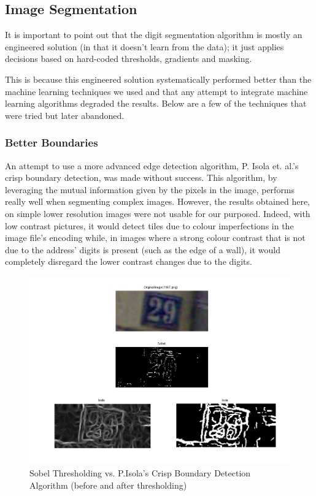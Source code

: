 \documentclass{article} %
\begin{document}
\subsection{Image Segmentation}

It is important to point out that the digit segmentation algorithm is mostly an engineered solution (in that it doesn’t learn from the data); it just applies decisions based on hard-coded thresholds, gradients and masking.

This is because this engineered solution systematically performed better than the machine learning techniques we used and that any attempt to integrate machine learning algorithms degraded the results. Below are a few of the techniques that were tried but later abandoned.

\subsubsection{Better Boundaries}
An attempt to use a more advanced edge detection algorithm, P. Isola et. al.’s crisp boundary detection\cite{isola2014crisp}, was made without success. This algorithm, by leveraging the mutual information given by the pixels in the image, performs really well when segmenting complex images. However, the results obtained here, on simple lower resolution images were not usable for our purposed. Indeed, with low contrast pictures, it would detect tiles due to colour imperfections in the image file’s encoding while, in images where a strong colour contrast that is not due to the address’ digits is present (such as the edge of a wall), it would completely disregard the lower contrast changes due to the digits.

\begin{center}
\begin{figure}[!htb]
  \includegraphics[width=0.8\linewidth]{image09}
  \caption{Sobel Thresholding vs. P.Isola's Crisp Boundary Detection Algorithm (before and after thresholding)}
  \label{fig:isola}
\end{figure}
\end{center}
\end{document}
